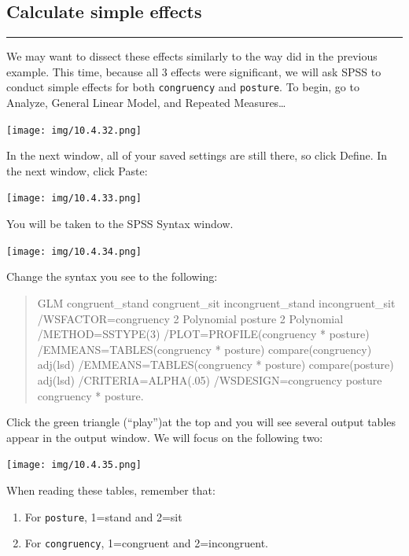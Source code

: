 \documentclass[
]{book}
\providecommand{\tightlist}{%
  \setlength{\itemsep}{0pt}\setlength{\parskip}{0pt}}
\begin{document}
\hypertarget{calculate-simple-effects-1}{%
\subsection{Calculate simple effects}\label{calculate-simple-effects-1}}

\begin{center}\rule{0.5\linewidth}{0.5pt}\end{center}

We may want to dissect these effects similarly to the way did in the previous example. This time, because all 3 effects were significant, we will ask SPSS to conduct simple effects for both \texttt{congruency} and \texttt{posture}. To begin, go to {Analyze}, {General Linear Model}, and {Repeated Measures\ldots{}}

\texttt{[image: img/10.4.32.png]}

In the next window, all of your saved settings are still there, so click {Define}. In the next window, click {Paste}:

\texttt{[image: img/10.4.33.png]}

You will be taken to the SPSS Syntax window.

\texttt{[image: img/10.4.34.png]}

Change the syntax you see to the following:

\begin{quote}
GLM congruent\_stand congruent\_sit incongruent\_stand incongruent\_sit
/WSFACTOR=congruency 2 Polynomial posture 2 Polynomial
/METHOD=SSTYPE(3)
/PLOT=PROFILE(congruency * posture)
/EMMEANS=TABLES(congruency * posture) compare(congruency) adj(lsd)
/EMMEANS=TABLES(congruency * posture) compare(posture) adj(lsd)
/CRITERIA=ALPHA(.05)
/WSDESIGN=congruency posture congruency * posture.
\end{quote}

Click the green triangle ({``play''})at the top and you will see several output tables appear in the output window. We will focus on the following two:

\texttt{[image: img/10.4.35.png]}

When reading these tables, remember that:

\begin{enumerate}
\def\labelenumi{\arabic{enumi}.}
\tightlist
\item
  For \texttt{posture}, 1=stand and 2=sit
\item
  For \texttt{congruency}, 1=congruent and 2=incongruent.
\end{enumerate}
\end{document}
